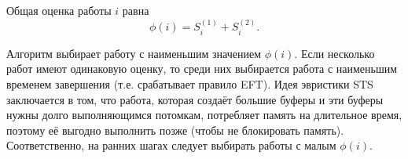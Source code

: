 Общая оценка работы $i$ равна
\[
\phi(i) = S^{(1)}_i + S^{(2)}_i.
\]

Алгоритм выбирает работу с наименьшим значением $\phi(i)$. Если несколько работ имеют одинаковую оценку, то среди них выбирается работа с наименьшим временем завершения (т.е. срабатывает правило EFT). Идея эвристики STS заключается в том, что работа, которая создаёт большие буферы и эти буферы нужны долго выполняющимся потомкам, потребляет память на длительное время, поэтому её выгодно выполнить позже (чтобы не блокировать память). Соответственно, на ранних шагах следует выбирать работы с малым $\phi(i)$.
